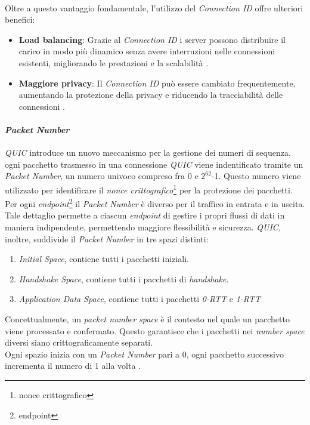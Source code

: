 \\
Oltre a questo vantaggio fondamentale, l'utilizzo del \emph{Connection ID} offre ulteriori benefici:
\begin{itemize}
\item \textbf{Load balancing}: Grazie al \emph{Connection ID} i server possono distribuire il carico in modo più dinamico senza avere interruzioni nelle connessioni esistenti, migliorando le prestazioni e la scalabilità \cite{quic}.
\item \textbf{Maggiore privacy}: Il \emph{Connection ID} può essere cambiato frequentemente, aumentando la protezione della privacy e riducendo la tracciabilità delle connessioni \cite{site:quic-security}.
\end{itemize}
\paragraph{\textit{Packet Number}}

\noindent \emph{QUIC} introduce un nuovo meccanismo per la gestione dei numeri di sequenza, ogni pacchetto trasmesso in una connessione \emph{QUIC} viene indentificato tramite un \emph{Packet Number}, un numero univoco 
compreso fra 0 e $2^{62}$-1. Questo numero viene utilizzato per identificare il \emph{nonce crittografico}\footnote{\gls{nonce crittografico}} per la protezione dei pacchetti. 
Per ogni \emph{endpoint}\footnote{\gls{endpoint}} il \emph{Packet Number} è diverso per il traffico in entrata e in uscita. 
Tale dettaglio permette a ciascun \emph{endpoint} di gestire i propri flussi di dati in maniera indipendente, permettendo maggiore flessibilità e sicurezza.
\emph{QUIC}, inoltre, suddivide il \emph{Packet Number} in tre spazi distinti:
\begin{enumerate}[label=\roman*]
    \item \emph{Initial Space}, contiene tutti i pacchetti iniziali.
    \item \emph{Handshake Space}, contiene tutti i pacchetti di \emph{handshake}.
    \item \emph{Application Data Space}, contiene tutti i pacchetti \emph{0-RTT} e \emph{1-RTT}
\end{enumerate}
\noindent Concettualmente, un \emph{packet number space} è il contesto nel quale un pacchetto viene processato e confermato. Questo garantisce che i pacchetti nei \emph{number space} diversi siano crittograficamente separati.
\\
Ogni spazio inizia con un \emph{Packet Number} pari a 0, ogni pacchetto successivo incrementa il numero di 1 alla volta \cite{site:rfc9000}. 

